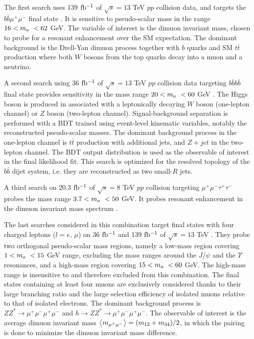 The first search uses 139 $\mbox{fb\(^{-1}\)}$ of $\sqrt{s}=13$ TeV $pp$ collision data, and targets the $b\bar{b}\mu^+\mu^-$ final state \cite{HDBS-2021-03}. It is sensitive to pseudo-scalar mass in the range $16<m_a~<62$ GeV. The variable of interest is the dimuon invariant mass, chosen to probe for a resonant enhancement over the SM expectation. The dominant background is the Drell-Yan dimuon process together with $b$ quarks and SM $t\bar{t}$ production where both $W$ bosons from the top quarks decay into a muon and a neutrino. 

A second search using 36 $\mbox{fb\(^{-1}\)}$ of $\sqrt{s}=13$ TeV $pp$ collision data targeting $b\bar{b}b\bar{b}$ final state provides sensitivity in the mass range $20<m_a~<60$ GeV \cite{HIGG-2017-05}. The Higgs boson is produced in associated with a leptonically decaying $W$ boson (one-lepton channel) or $Z$ boson (two-lepton channel). Signal-background separation is performed with a BDT trained using event-level kinematic variables, notably the reconstructed pseudo-scalar masses. The dominant background process in the one-lepton channel is $t\bar{t}$ production with additional jets, and $Z+jet$ in the two-lepton channel. The BDT output distribution is used as the observable of interest in the final likelihood fit. This search is optimized for the resolved topology of the $b\bar{b}$ dijet system, i.e. they are reconstructed as two small-$R$ jets. 

A third search on 20.3 $\mbox{fb\(^{-1}\)}$ of $\sqrt{s}=8$ TeV $pp$ collision targeting $\mu^+\mu^-\tau^+\tau^-$ probes the mass range $3.7<m_a~<50$ GeV. It probes resonant enhancement in the dimuon invariant mass spectrum \cite{HIGG-2014-02}.

The last searches considered in this combination target final states with four charged leptons ($l=e,\,\mu$) on 36 $\mbox{fb\(^{-1}\)}$ and 139 $\mbox{fb\(^{-1}\)}$ of $\sqrt{s}=13$ TeV \cite{EXOT-2016-22, HDBS-2018-55}. They probe two orthogonal pseudo-scalar mass regions, namely a low-mass region covering $1<m_a~<15$ GeV range, excluding the mass ranges around the $J/\psi$ and the $\Upsilon$ resonances, and a high-mass region covering $15<m_a~<60$ GeV. The high-mass range is insensitive to \thdma and therefore excluded from this combination. The final states containing at least four muons are exclusively considered thanks to their large branching ratio and the large selection efficiency of isolated muons relative to that of isolated electrons. The dominant background process is $ZZ^*\rightarrow \mu^+\mu^-\mu^+\mu^-$ and $h\rightarrow ZZ^*\rightarrow \mu^+\mu^-\mu^+\mu^-$. The observable of interest is the average dimuon invariant mass $\expval{m_{\mu^+\mu^-}} = (m_{12} + m_{34})/2$, in which the pairing is done to minimize the dimuon invariant mass difference. 

